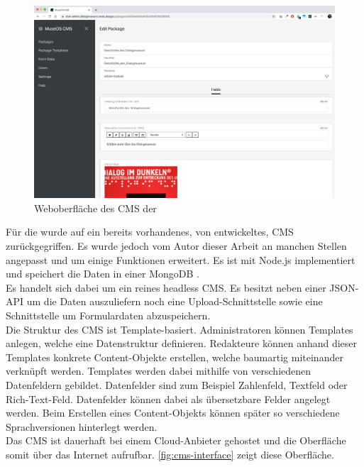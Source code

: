 \begin{figure}
    \centering
    \includegraphics[width=1\textwidth]{figures/images/cms-interface.png}
    \caption{Weboberfläche des CMS der \shst{}}
    \label{fig:cms-interface}
\end{figure}

Für die \shst{} wurde auf ein bereits vorhandenes, von \meso{} entwickeltes,
CMS zurückgegriffen. Es wurde jedoch vom Autor dieser Arbeit
an manchen Stellen angepasst und um einige Funktionen
erweitert. Es ist mit Node.js \cite{node} implementiert und speichert die Daten in einer 
MongoDB \cite{mongo}.\\
Es handelt sich dabei um ein reines headless CMS. Es besitzt neben einer JSON-API um die Daten 
auszuliefern noch eine Upload-Schnittstelle sowie eine Schnittstelle um Formulardaten abzuspeichern.\\
Die Struktur des CMS ist Template-basiert. Administratoren können Templates 
anlegen, welche eine Datenstruktur definieren. Redakteure können anhand dieser Templates 
konkrete Content-Objekte erstellen, welche baumartig miteinander verknüpft werden. Templates 
werden dabei mithilfe von verschiedenen Datenfeldern gebildet. Datenfelder sind zum Beispiel
Zahlenfeld, Textfeld oder Rich-Text-Feld. Datenfelder können dabei als übersetzbare Felder angelegt
werden. Beim Erstellen eines Content-Objekts können später so verschiedene Sprachversionen
hinterlegt werden.\\
Das CMS ist dauerhaft bei einem Cloud-Anbieter gehostet und die Oberfläche somit über das
Internet aufrufbar. \autoref{fig:cms-interface} zeigt diese Oberfläche.
